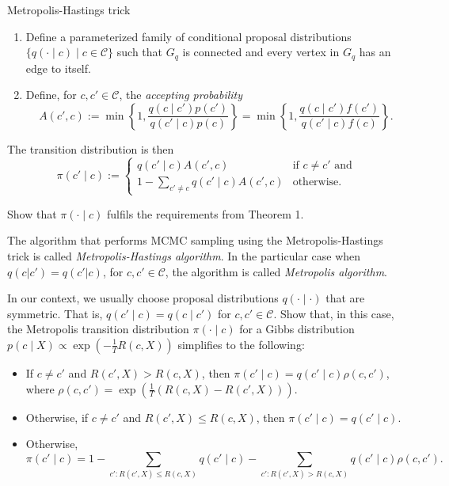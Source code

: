\begin{definition}{Metropolis-Hastings trick}
\begin{enumerate}
\item Define a parameterized family of conditional proposal distributions
$\{q(\cdot \mid c) \mid c \in \mathcal{C}\}$ such that $G_q$ is connected and every vertex in $G_q$
has an edge to itself.
\item Define, for $c, c' \in \mathcal{C}$, the \emph{accepting probability}
%
\begin{equation}
A(c', c) := \min\left\{1, \frac{q(c \mid c')p(c')}{q(c' \mid c)p(c)}\right\} = \min\left\{1, \frac{q(c \mid c')f(c')}{q(c' \mid c)f(c)}\right\}.
\end{equation}
%
\end{enumerate}
%
The transition distribution is then
%
\begin{equation}
\pi(c' \mid c) := \begin{cases}
q(c' \mid c)A(c', c) & \text{if $c \neq c'$ and}\\
1 - \sum_{c' \neq c}q(c' \mid c)A(c', c) & \text{otherwise}.
\end{cases}
\end{equation}
%
\end{definition}

\begin{exercise}
Show that $\pi(\cdot \mid c)$ fulfils the requirements from Theorem 1.
\end{exercise}

\begin{definition}
The algorithm that performs MCMC sampling using the Metropolis-Hastings trick is called \emph{Metropolis-Hastings algorithm}. In the particular case when $q(c | c') = q(c' | c)$, for $c, c' \in \mathcal{C}$, the algorithm is called \emph{Metropolis algorithm}.
\end{definition}

\begin{exercise}
In our context, we usually choose proposal distributions $q(\cdot \mid \cdot)$
that are symmetric. That is, $q(c' \mid c) = q(c \mid c')$ for $c, c' \in \mathcal{C}$. Show that,
in this case, the Metropolis transition distribution $\pi(\cdot \mid c)$ for a
Gibbs distribution $p(c \mid X) \propto \exp\left(-\frac{1}{T}R(c, X)\right)$ simplifies to the following:

\begin{itemize}
\item If $c \neq c'$ and $R(c', X) > R(c, X)$, then $\pi(c' \mid c) = q(c' \mid c)\rho(c, c')$, where $\rho(c, c') = \exp\left(\frac{1}{T}\left(R(c, X) - R(c', X)\right)\right)$.
\item Otherwise, if $c \neq c'$ and $R(c', X) \leq R(c, X)$, then $\pi(c' \mid c) = q(c' \mid c)$.
\item Otherwise,
%
\begin{equation}
\pi(c' \mid c) = 1 - \sum_{c' : R(c', X) \leq R(c, X)}q(c' \mid c) - \sum_{c': R(c', X) > R(c, X)}q(c' \mid c)\rho(c, c').
\end{equation}
%
\end{itemize}
\end{exercise}

